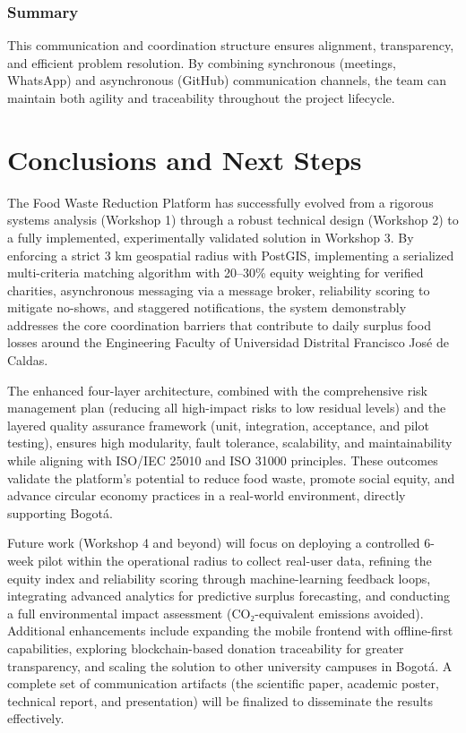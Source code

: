 \documentclass[9pt,conference]{IEEEtran}
\begin{document}
\subsubsection{Summary}

This communication and coordination structure ensures alignment, transparency, and efficient problem resolution. By combining synchronous (meetings, WhatsApp) and asynchronous (GitHub) communication channels, the team can maintain both agility and traceability throughout the project lifecycle.

\section{Conclusions and Next Steps}
The Food Waste Reduction Platform has successfully evolved from a rigorous systems analysis (Workshop 1) through a robust technical design (Workshop 2) to a fully implemented, experimentally validated solution in Workshop 3. By enforcing a strict 3 km geospatial radius with PostGIS, implementing a serialized multi-criteria matching algorithm with 20--30\% equity weighting for verified charities, asynchronous messaging via a message broker, reliability scoring to mitigate no-shows, and staggered notifications, the system demonstrably addresses the core coordination barriers that contribute to daily surplus food losses around the Engineering Faculty of Universidad Distrital Francisco José de Caldas. 

The enhanced four-layer architecture, combined with the comprehensive risk management plan (reducing all high-impact risks to low residual levels) and the layered quality assurance framework (unit, integration, acceptance, and pilot testing), ensures high modularity, fault tolerance, scalability, and maintainability while aligning with ISO/IEC 25010 and ISO 31000 principles. These outcomes validate the platform's potential to reduce food waste, promote social equity, and advance circular economy practices in a real-world environment, directly supporting Bogotá.

Future work (Workshop 4 and beyond) will focus on deploying a controlled 6-week pilot within the operational radius to collect real-user data, refining the equity index and reliability scoring through machine-learning feedback loops, integrating advanced analytics for predictive surplus forecasting, and conducting a full environmental impact assessment (CO₂-equivalent emissions avoided). Additional enhancements include expanding the mobile frontend with offline-first capabilities, exploring blockchain-based donation traceability for greater transparency, and scaling the solution to other university campuses in Bogotá. A complete set of communication artifacts (the scientific paper, academic poster, technical report, and presentation) will be finalized to disseminate the results effectively.
\end{document}
